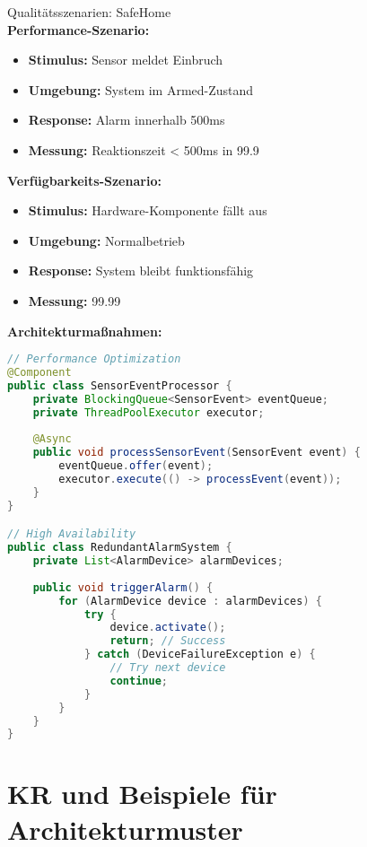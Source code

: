 \begin{example2}[breakable]{Qualitätsszenarien: SafeHome}\\
\textbf{Performance-Szenario:}
\begin{itemize}
    \item \textbf{Stimulus:} Sensor meldet Einbruch
    \item \textbf{Umgebung:} System im Armed-Zustand
    \item \textbf{Response:} Alarm innerhalb 500ms
    \item \textbf{Messung:} Reaktionszeit < 500ms in 99.9%
\end{itemize}

\textbf{Verfügbarkeits-Szenario:}
\begin{itemize}
    \item \textbf{Stimulus:} Hardware-Komponente fällt aus
    \item \textbf{Umgebung:} Normalbetrieb
    \item \textbf{Response:} System bleibt funktionsfähig
    \item \textbf{Messung:} 99.99%
\end{itemize}

\textbf{Architekturmaßnahmen:}
\begin{lstlisting}[language=Java, style=basesmol]
// Performance Optimization
@Component
public class SensorEventProcessor {
    private BlockingQueue<SensorEvent> eventQueue;
    private ThreadPoolExecutor executor;
    
    @Async
    public void processSensorEvent(SensorEvent event) {
        eventQueue.offer(event);
        executor.execute(() -> processEvent(event));
    }
}

// High Availability
public class RedundantAlarmSystem {
    private List<AlarmDevice> alarmDevices;
    
    public void triggerAlarm() {
        for (AlarmDevice device : alarmDevices) {
            try {
                device.activate();
                return; // Success
            } catch (DeviceFailureException e) {
                // Try next device
                continue;
            }
        }
    }
}
\end{lstlisting}
\end{example2}

\section{KR und Beispiele für Architekturmuster}


